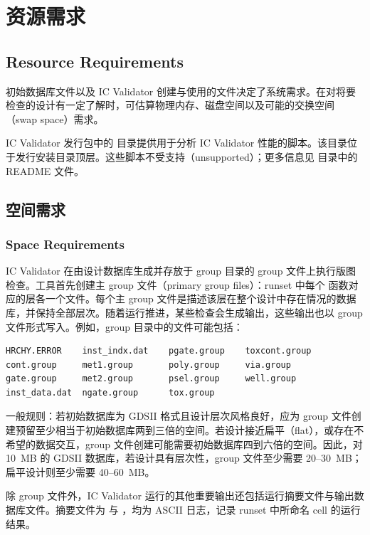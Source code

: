 \section{资源需求}
\subsection*{Resource Requirements}

初始数据库文件以及 IC Validator 创建与使用的文件决定了系统需求。在对将要检查的设计有一定了解时，可估算物理内存、磁盘空间以及可能的交换空间（swap space）需求。

IC Validator 发行包中的  目录提供用于分析 IC Validator 性能的脚本。该目录位于发行安装目录顶层。这些脚本不受支持（unsupported）；更多信息见  目录中的 README 文件。

\subsection{空间需求}
\subsubsection*{Space Requirements}

IC Validator 在由设计数据库生成并存放于 group 目录的 group 文件上执行版图检查。工具首先创建主 group 文件（primary group files）：runset 中每个  函数对应的层各一个文件。每个主 group 文件是描述该层在整个设计中存在情况的数据库，并保持全部层次。随着运行推进，某些检查会生成输出，这些输出也以 group 文件形式写入。例如，group 目录中的文件可能包括：
\begin{lstlisting}
HRCHY.ERROR    inst_indx.dat    pgate.group    toxcont.group
cont.group     met1.group       poly.group     via.group
gate.group     met2.group       psel.group     well.group
inst_data.dat  ngate.group      tox.group
\end{lstlisting}

一般规则：若初始数据库为 GDSII 格式且设计层次风格良好，应为 group 文件创建预留至少相当于初始数据库两到三倍的空间。若设计接近扁平（flat），或存在不希望的数据交互，group 文件创建可能需要初始数据库四到六倍的空间。因此，对 10~MB 的 GDSII 数据库，若设计具有层次性，group 文件至少需要 20--30~MB；扁平设计则至少需要 40--60~MB。

除 group 文件外，IC Validator 运行的其他重要输出还包括运行摘要文件与输出数据库文件。摘要文件为  与 ，均为 ASCII 日志，记录 runset 中所命名 cell 的运行结果。

